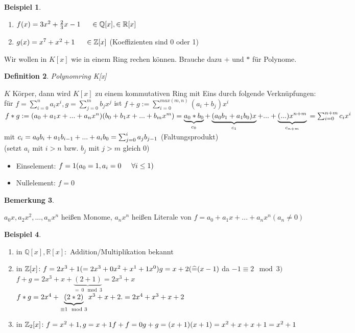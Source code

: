 \documentclass[a4paper,11pt]{article}
\newtheorem{definition}{Definition}[section]
\newtheorem{bsp}[definition]{Beispiel}
\newtheorem{bem}[definition]{Bemerkung}
\begin{document}
\begin{bsp}
\end{bsp}
\begin{enumerate}[label=\alph*)]
\item $f(x)=3x^2+\frac{2}{3}x-1\hspace{5mm}\in\mathbb{Q}[x], \in\mathbb{R}[x]$
\item $g(x)=x^7+x^2+1\hspace{5mm}\in\mathbb{Z}[x]$ (Koeffizienten sind 0 oder 1)
\end{enumerate}
Wir wollen in $K[x]$ wie in einem Ring rechen können. Brauche dazu $+$ und $*$ für Polynome.
\begin{definition}
Polynomring K[x]
\end{definition}
$K$ Körper, dann wird $K[x]$ zu einem kommutativen Ring mit Eins durch folgende Verknüpfungen: \\
für $f=\sum^n_{i=0}a_ix^i, g=\sum^m_{j=0}b_jx^j$ ist $f+g:= \sum^{max(m,n)}_{i=0}(a_i+b_j)x^i$ \\
$f*g:=(a_0+a_1x+...+a_nx^n)(b_0+b_1x+...+b_mx^m) \\
= \underbrace{a_0*b_0}_{c_0}+\underbrace{(a_0b_1+a_1b_0)x}_{c_1}+...+\underbrace{(...)x^{n+m}}_{c_{n+m}} \\
= \sum^{n+m}_{i=0}c_ix^i$ \\
mit $c_i=a_0b_i+a_1b_{i-1}+...+a_ib_0 \\
= \sum^i_{j=0}a_jb_{j-1}$ (Faltungsprodukt) \\
(setzt $a_i$ mit $i>n$ bzw. $b_j$ mit $j>m$ gleich 0)
\begin{itemize}
\item Einselement: $f=1 (a_0=1,a_i=0\hspace{5mm}\forall i\leq 1)$
\item Nullelement: $f=0$
\end{itemize}
\begin{bem}
\end{bem}
$a_0x,a_2x^2,...,a_nx^n$ heißen Monome, $a_nx^n$ heißen Literale von $f=a_0+a_1x+...+a_nx^n (a_n\neq 0)$
\newpage
\begin{bsp}
\end{bsp}
\begin{enumerate}[label=\alph*)]
\item in $\mathbb{Q}[x], \mathbb{R}[x]\colon$ Addition/Multiplikation bekannt
\item in $\mathbb{Z}[x]\colon f=2x^3+1(=2x^3+0x^2+x^1+1x^0) \\
g=x+2 \\
(\widehat{=}(x-1)$ da $-1\equiv2\mod 3)$ \\
$f+g=2x^3+x+\underbrace{(2+1)}_{=\:0 \mod 3}=2x^3+x$ \\
$f*g=2x^4+\underbrace{(2*2)}_{\equiv 1 \mod 3}x^3+x+2. \\
=2x^4+x^3+x+2$
\item in $\mathbb{Z}_2[x]\colon f=x^2+1, g=x+1 \\
f+f=0 \\
g+g=(x+1)(x+1)=x^2+x+x+1=x^2+1$
\end{enumerate}
\end{document}
